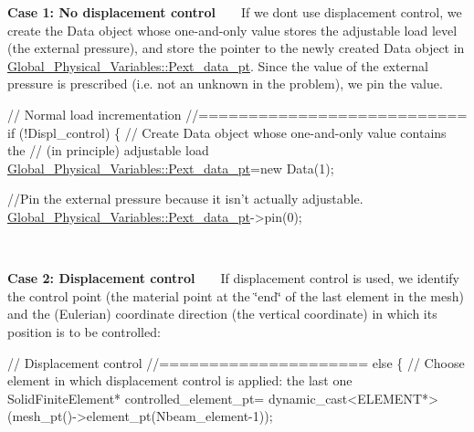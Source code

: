 \begin{DoxyItemize}
\item {\bfseries Case 1\+: No displacement control} ~\newline
~\newline
 If we don\textquotesingle{}t use displacement control, we create the {\ttfamily Data} object whose one-\/and-\/only value stores the adjustable load level (the external pressure), and store the pointer to the newly created {\ttfamily Data} object in {\ttfamily \hyperlink{namespaceGlobal__Physical__Variables_a9d598320fb3d7ecf94101088e8f376d2}{Global\+\_\+\+Physical\+\_\+\+Variables\+::\+Pext\+\_\+data\+\_\+pt}}. Since the value of the external pressure is prescribed (i.\+e. not an unknown in the problem), we pin the value. ~\newline
~\newline
 
\begin{DoxyCodeInclude}
 \textcolor{comment}{// Normal load incrementation}
 \textcolor{comment}{//===========================}
 \textcolor{keywordflow}{if} (!Displ\_control) 
  \{
   \textcolor{comment}{// Create Data object whose one-and-only value contains the}
   \textcolor{comment}{// (in principle) adjustable load}
   \hyperlink{namespaceGlobal__Physical__Variables_a9d598320fb3d7ecf94101088e8f376d2}{Global\_Physical\_Variables::Pext\_data\_pt}=\textcolor{keyword}{new} Data(1);
   
   \textcolor{comment}{//Pin the external pressure because it isn't actually adjustable.}
   \hyperlink{namespaceGlobal__Physical__Variables_a9d598320fb3d7ecf94101088e8f376d2}{Global\_Physical\_Variables::Pext\_data\_pt}->pin(0);

\end{DoxyCodeInclude}
 ~\newline
~\newline

\item {\bfseries Case 2\+: Displacement control} ~\newline
~\newline
 If displacement control is used, we identify the control point (the material point at the \char`\"{}end\char`\"{} of the last element in the mesh) and the (Eulerian) coordinate direction (the vertical coordinate) in which its position is to be controlled\+:~\newline
~\newline
 
\begin{DoxyCodeInclude}
 \textcolor{comment}{// Displacement control}
 \textcolor{comment}{//=====================}
 \textcolor{keywordflow}{else}
  \{
   \textcolor{comment}{// Choose element in which displacement control is applied: the last one}
   SolidFiniteElement* controlled\_element\_pt=
    \textcolor{keyword}{dynamic\_cast<}ELEMENT*\textcolor{keyword}{>}(mesh\_pt()->element\_pt(Nbeam\_element-1));
   

\end{DoxyCodeInclude}
\end{DoxyItemize}
